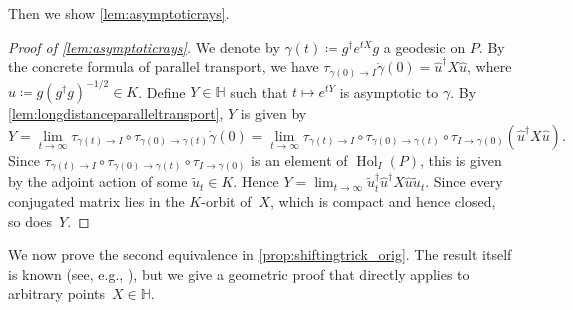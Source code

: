 \documentclass[11pt,letterpaper]{article}
\numberwithin{equation}{section}
\newcommand{\bbH}{\mathbb{H}}
\DeclareMathOperator{\Hol}{Hol}
\begin{document}
Then we show \cref{lem:asymptoticrays}.
\begin{proof}[Proof of \cref{lem:asymptoticrays}]
    We denote by $\gamma(t) \coloneqq g^\dagger e^{tX}g$ a geodesic on $P$.
    By the concrete formula of parallel transport, we have $\tau_{\gamma(0) \to I}\dot\gamma(0) = \hat u^\dagger X\hat u$, where $\hat u \coloneqq g(g^\dagger g)^{-1/2} \in K$.
    Define $Y \in \bbH$ such that $t \mapsto e^{tY}$ is asymptotic to $\gamma$.
    By \cref{lem:longdistanceparalleltransport}, $Y$ is given by
    \[
        Y = \lim_{t \to \infty}\tau_{\gamma(t) \to I}\circ\tau_{\gamma(0) \to \gamma(t)}\dot\gamma(0)
        = \lim_{t \to \infty}\tau_{\gamma(t) \to I}\circ\tau_{\gamma(0) \to \gamma(t)}\circ\tau_{I \to \gamma(0)}(\hat u^\dagger X\hat u).
    \]
    Since $\tau_{\gamma(t) \to I}\circ\tau_{\gamma(0) \to \gamma(t)}\circ\tau_{I \to \gamma(0)}$ is an element of $\Hol_I(P)$, this is given by the adjoint action of some ${\tilde u}_t \in K$.
    Hence $Y = \lim_{t \to \infty}{\tilde u}_t^\dagger \hat u^\dagger X\hat u{\tilde u}_t$.
    Since every conjugated matrix lies in the $K$-orbit of~$X$, which is compact and hence closed, so does~$Y$.
\end{proof}

We now prove the second equivalence in \cref{prop:shiftingtrick_orig}.
The result itself is known (see, e.g., \cite{FW2020}), but we give a geometric proof that directly applies to arbitrary points~$X \in \bbH$.
\end{document}
